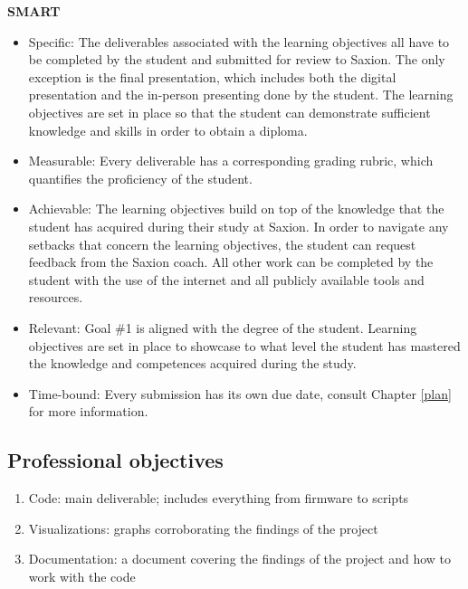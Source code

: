 \documentclass{report}
\begin{document}
	\textbf{SMART}
	\begin{itemize}
		\item Specific: The deliverables associated with the learning objectives all have to be completed by the student and submitted for review to Saxion. The only exception is the final presentation, which includes both the digital presentation and the in-person presenting done by the student. The learning objectives are set in place so that the student can demonstrate sufficient knowledge and skills in order to obtain a diploma.
		\item Measurable: Every deliverable has a corresponding grading rubric, which quantifies the proficiency of the student.
		\item Achievable: The learning objectives build on top of the knowledge that the student has acquired during their study at Saxion. In order to navigate any setbacks that concern the learning objectives, the student can request feedback from the Saxion coach. All other work can be completed by the student with the use of the internet and all publicly available tools and resources.   
		\item Relevant: Goal \#1 is aligned with the degree of the student. Learning objectives are set in place to showcase to what level the student has mastered the knowledge and competences acquired during the study.
		\item Time-bound: Every submission has its own due date, consult Chapter \ref{plan} for more information.
	\end{itemize}
	\subsection{Professional objectives}
	\begin{enumerate}
		\item Code: main deliverable; includes everything from firmware to scripts
		\item Visualizations: graphs corroborating the findings of the project
		\item Documentation: a document covering the findings of the project and how to work with the code  
	\end{enumerate}
	
\end{document}
